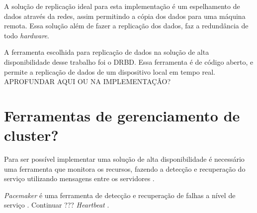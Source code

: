 A solução de replicação ideal para esta implementação é um espelhamento de dados através da redes, assim permitindo a cópia dos dados para uma
máquina remota. Essa solução além de fazer a replicação dos dados, faz a redundância de todo \textit{hardware}.

A ferramenta escolhida para replicação de dados na solução de alta disponibilidade desse trabalho foi o \ac{DRBD}. Essa ferramenta é de código
aberto, e permite a replicação de dados de um dispositivo local em tempo real. 
APROFUNDAR AQUI OU NA IMPLEMENTAÇÂO?


\section{Ferramentas de gerenciamento de cluster?}
\label{section:toolcluster}

Para ser possível implementar uma solução de alta disponibilidade é necessário uma ferramenta que monitora os recursos, fazendo a detecção e
recuperação do serviço utilizando mensagens entre os servidores \cite{perkov2011}.

\textit{Pacemaker} é uma ferramenta de detecção e recuperação de falhas a nível de serviço \cite{perkov2011}. 
Continuar ??? \textit{Heartbeat} \cite{zaminhani2008}.



